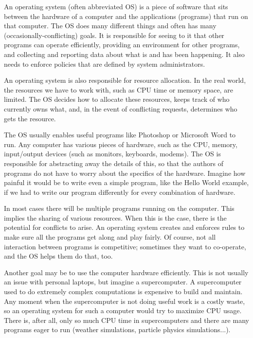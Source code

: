An operating system (often abbreviated OS) is a piece of software that sits between the hardware of a computer and the applications (programs) that run on that computer. The OS does many different things and often has many (occasionally-conflicting) goals. It is responsible for seeing to it that other programs can operate efficiently, providing an environment for other programs, and collecting and reporting data about what is and has been happening. It also needs to enforce policies that are defined by system administrators.



An operating system is also responsible for resource allocation. In the real world, the resources we have to work with, such as CPU time or memory space, are limited. The OS decides how to allocate these resources, keeps track of who currently owns what, and, in the event of conflicting requests, determines who gets the resource.

The OS usually enables useful programs like Photoshop or Microsoft Word to run. Any computer has various pieces of hardware, such as the CPU, memory, input/output devices (such as monitors, keyboards, modems). The OS is responsible for abstracting away the details of this, so that the authors of programs do not have to worry about the specifics of the hardware. Imagine how painful it would be to write even a simple program, like the Hello World example, if we had to write our program differently for every combination of hardware.

In most cases there will be multiple programs running on the computer. This implies the sharing of various resources. When this is the case, there is the potential for conflicts to arise. An operating system creates and enforces rules to make sure all the programs get along and play fairly. Of course, not all interaction between programs is competitive; sometimes they want to co-operate, and the OS helps them do that, too.

Another goal may be to use the computer hardware efficiently. This is not usually an issue with personal laptops, but imagine a supercomputer. A supercomputer used to do extremely complex computations is expensive to build and maintain. Any moment when the supercomputer is not doing useful work is a costly waste, so an operating system for such a computer would try to maximize CPU usage. There is, after all, only so much CPU time in supercomputers and there are many programs eager to run (weather simulations, particle physics simulations...).

